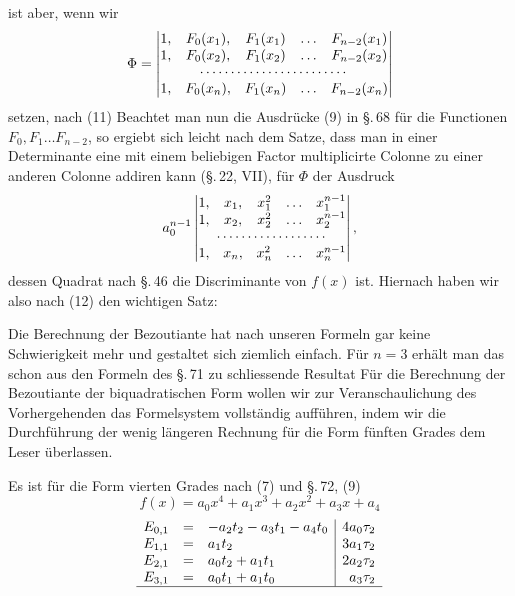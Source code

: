 ist aber, wenn wir
\[
\Phi =
\begin{vmatrix}
1, & F_0(x_1), & F_1(x_1) & \ldots & F_{n-2}(x_1) \\
1, & F_0(x_2), & F_1(x_2) & \ldots & F_{n-2}(x_2) \\
\multicolumn{5}{c}{\cdots\cdots\cdots\cdots\cdots\cdots\cdots\cdots} \\
1, & F_0(x_n), & F_1(x_n) & \ldots & F_{n-2}(x_n)
\end{vmatrix}
\]
setzen, nach (11)
Beachtet man nun die Ausdrücke (9) in \S.\,68 für die Functionen
$F_0, F_1 \ldots F_{n-2}$, so ergiebt sich leicht nach dem Satze,
dass man in einer Determinante eine mit einem beliebigen Factor
multiplicirte Colonne zu einer anderen Colonne addiren kann
(\S.\,22, VII), für $\Phi$ der Ausdruck
\[
a_0^{n-1}
\begin{vmatrix}
1, & x_1, & x_1^2 & \ldots & x_1^{n-1} \\
1, & x_2, & x_2^2 & \ldots & x_2^{n-1} \\
\multicolumn{5}{c}{\cdots\cdots\cdots\cdots\cdots\cdots} \\
1, & x_n, & x_n^2 & \ldots & x_n^{n-1}
\end{vmatrix},
\]
dessen Quadrat nach \S.\,46 die Discriminante von $f(x)$ ist. Hiernach
haben wir also nach (12) den wichtigen Satz:


Die Berechnung der Bezoutiante hat nach unseren Formeln
gar keine Schwierigkeit mehr und gestaltet sich ziemlich einfach.
Für $n = 3$ erhält man das schon aus den Formeln des
\S.\,71 zu schliessende Resultat
Für die Berechnung der Bezoutiante der biquadratischen
Form wollen wir zur Veranschaulichung des Vorhergehenden
das Formelsystem vollständig aufführen, indem wir die Durchführung
der wenig längeren Rechnung für die Form fünften
Grades dem Leser überlassen.

Es ist für die Form vierten Grades nach (7) und \S.\,72, (9)
\[
f(x) = a_0 x^4 + a_1 x^3 + a_2 x^2 + a_3 x + a_4
\]
\[
\begin{array}{rcl|r}
E_{0,1} &=& -a_2 t_2 - a_3 t_1 - a_4 t_0 & 4 a_0 \tau_2 \\
E_{1,1} &=& a_1 t_2 & 3 a_1 \tau_2 \\
E_{2,1} &=& a_0 t_2 + a_1 t_1 & 2 a_2 \tau_2 \\
E_{3,1} &=& a_0 t_1 + a_1 t_0 & a_3 \tau_2 \\
\hline
\end{array}
\]
